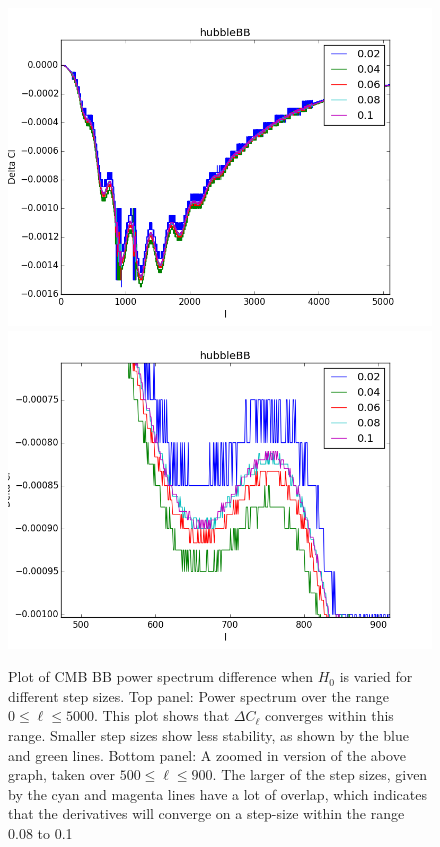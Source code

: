 \begin{figure}[tbhp]
\centering
\includegraphics[scale=0.6]{images/diffs/H0bb.png}
\includegraphics[scale=0.6]{images/diffs/H0bbz.png}
\caption{Plot of CMB BB power spectrum difference when $H_{0}$ is varied for different step sizes. Top panel: Power spectrum over the range $0 \leq \ell \leq 5000$. This plot shows that $\Delta C_{\ell}$ converges within this range. Smaller step sizes show less stability, as shown by the blue and green lines. Bottom panel: A zoomed in version of the above graph, taken over $500 \leq \ell \leq 900$. The larger of the step sizes, given by the cyan and magenta lines have a lot of overlap, which indicates that the derivatives will converge on a step-size within the range 0.08 to 0.1}
\end{figure}

